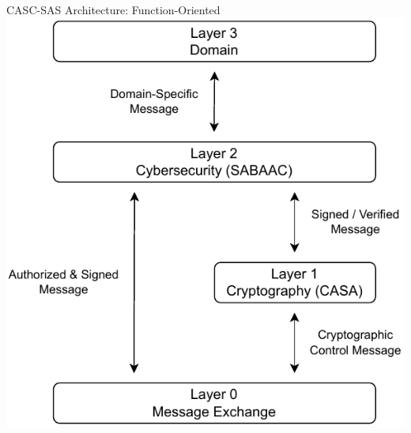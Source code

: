 \documentclass[en]{sdqbeamer}
\begin{document}
\begin{frame}{CASC-SAS Architecture: Function-Oriented}
    \centering
    \includegraphics[height=0.75\textheight]{./figures/layers_request_example_shortened.drawio.pdf}
\end{frame}
\end{document}
